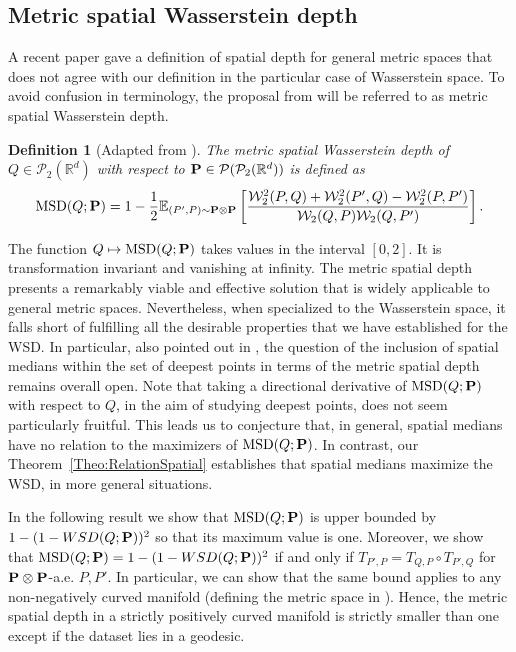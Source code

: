 \documentclass{imsart}
\newtheorem {Definition}{Definition}[section]
\numberwithin{equation}{section}
\def\R{\mathbb{R}}
\def\E{\mathbb{E}}
\def\E{\mathbb E}
\begin{document}
\subsection{Metric spatial Wasserstein depth}
A recent paper \cite{virta2023spatial} gave a definition of spatial depth for general metric spaces that does not agree with our definition in the particular case of Wasserstein space.  
To avoid confusion in terminology, the proposal from \cite{virta2023spatial} will be referred to as metric spatial Wasserstein depth.
\begin{Definition}[Adapted from \cite{virta2023spatial}]
	The metric spatial Wasserstein depth of $Q\in \mathcal{P}_2(\R^d)$  with respect to ${\bf P}\in \mathcal{P}(\mathcal{P}_2(\R^d))$ is defined as
	$$ \mathrm{MSD}(Q;{\bf P} )= 1-\frac{1}{2}\E_{(P',P)\sim {\bf P} \otimes {\bf P} }\left[\frac{\mathcal{W}_2^2( P,Q)+\mathcal{W}_2^2( P',Q)-\mathcal{W}_2^2( P,P')}{\mathcal{W}_2( Q,P)\mathcal{W}_2( Q,P')} \right]. $$
\end{Definition}
The function $Q\mapsto \mathrm{MSD}(Q;{\bf P} )$ takes values in the interval $[0,2]$.  It is transformation invariant and vanishing at infinity. The metric spatial depth presents a remarkably viable and effective solution that is widely applicable to general metric spaces. Nevertheless, when specialized to the Wasserstein space, it falls short of fulfilling all the desirable properties that we have established for the WSD.
In particular, also pointed out in \cite{virta2023spatial}, the question of the inclusion of spatial medians within the set of deepest points in terms of the metric spatial depth remains overall open.
Note that taking a directional derivative of $\mathrm{MSD}(Q;{\bf P} )$ with respect to $Q$, in the aim of studying deepest points, does not seem particularly fruitful.
This leads us to conjecture that, in general, spatial medians have no relation to the maximizers of $\mathrm{MSD}(Q;{\bf P} )$.
In contrast, our Theorem~\ref{Theo:RelationSpatial} establishes that spatial medians maximize the WSD, in more general situations.





In the following result we show that $\mathrm{MSD}(Q;{\bf P} )$ is upper bounded by $1-(1- {\rm WSD}(Q;{\bf P} ))^2$ so that   its maximum  value is one. Moreover, we show that $\mathrm{MSD}(Q;{\bf P} )= 1-(1- {\rm WSD}(Q;{\bf P} ))^2$ if and only if  $T_{P',P}=T_{Q,P} \circ T_{P',Q}$ for ${\bf P}\otimes {\bf P}$-a.e. $P,P'$. In particular, we can show that the same bound applies to any non-negatively curved manifold (defining the metric space in \cite{virta2023spatial}).   Hence, the metric spatial depth  in a strictly  positively curved manifold is strictly smaller than one except if the dataset lies in a geodesic.   
\end{document}
